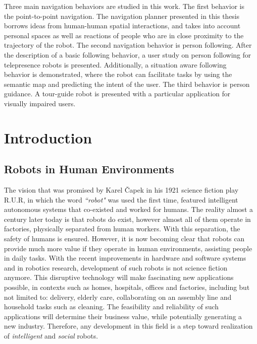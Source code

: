 \documentclass[12pt]{gatech-thesis}
\begin{document}
\begin{preliminary}
\begin{summary}
Three main navigation behaviors are studied in this work. The first behavior is the point-to-point navigation. The navigation planner presented in this thesis borrows ideas from human-human spatial interactions, and takes into account personal spaces as well as reactions of people who are in close proximity to the trajectory of the robot. The second navigation behavior is person following. After the description of a basic following behavior, a user study on person following for telepresence robots is presented. Additionally, a situation aware following behavior is demonstrated, where the robot can facilitate tasks by using the semantic map and predicting the intent of the user. The third behavior is person guidance. A tour-guide robot is presented with a particular application for visually impaired users.

\end{summary}
\end{preliminary}

%

\chapter{Introduction}
\label{chapter:introduction}


\section{Robots in Human Environments}

The vision that was promised by Karel \v{C}apek in his 1921 science fiction play R.U.R, in which the word \textit{``robot"} was used the first time, featured intelligent autonomous systems that co-existed and worked for humans. The reality almost a century later today is that robots do exist, however almost all of them operate in factories, physically separated from human workers. With this separation, the safety of humans is ensured. However, it is now becoming clear that robots can provide much more value if they operate in human environments, assisting people in daily tasks. With the recent improvements in hardware and software systems and in robotics research, development of such robots is not science fiction anymore. This disruptive technology will make fascinating new applications possible, in contexts such as homes, hospitals, offices and factories, including but not limited to: delivery, elderly care, collaborating on an assembly line and household tasks such as cleaning. The feasibility and reliability of such applications will determine their business value, while potentially generating a new industry. Therefore, any development in this field is a step toward realization of \textit{intelligent} and \textit{social} robots.
\end{document}
